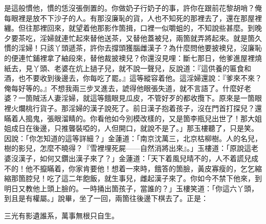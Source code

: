 是這般慣他，慣的恁沒張倒置的。你做奶子行奶子的事，許你在跟前花黎胡哨？俺每眼裡是放不下沙子的人。有那沒廉恥的貨，人也不知死的那裡去了，還在那屋裡纏。但往那裡回來，就望着他那影作箇揖，口裡一似嚼蛆的，不知說些甚麼。到晚夕要茶吃，淫婦就連忙起來替他送茶，又替他蓋被兒，兩箇就弄將起來。就是箇久慣的淫婦！只該丫頭遞茶，許你去撐頭獲腦雌漢子？為什麼問他要披襖兒，沒廉恥的便連忙鋪裡拿了紬段來，替他裁披襖兒？你還沒見哩：斷七那日，他爹進屋裡燒紙去，見丫頭、老婆在炕上撾子兒，就不說一聲兒，反說道：『這供養的匾食和酒，也不要收到後邊去，你每吃了罷。』這等縱容着他。這淫婦還說：『爹來不來？俺每好等的。』不想我兩三步叉進去，諕得他眼張失道，就不言語了。什麼好老婆？一箇賊活人妻淫婦，就這等餓眼見瓜皮，不管好歹的都收攬下。原來是一箇眼裡火爛桃行貨子。那淫婦的漢子說死了。前日漢子抱着孩子，沒在門首打探兒？還瞞着人搗鬼，張眼溜睛的。你看他如今別模改樣的，又是箇李瓶兒出世了！{}那大姐姐成日在後邊，只推聾裝啞的，人但開口，就說不是了。」那玉樓聽了，只是笑。因說：「你怎知道的這等詳細？」金蓮道：「南京沈萬三，北京枯柳樹。人的名兒，樹的影兒，怎麼不曉得？『雪裡埋死屍——自然消將出來』。」玉樓道：「原說這老婆沒漢子，如何又鑽出漢子來了？」金蓮道：「天下着風兒晴不的，人不着謊兒成不的！他不攛瞞着，你家肯要他！想着一來時，餓答的箇臉，黃皮寡瘦的，乞乞縮縮那箇腔兒！{}吃了這二年飽飯，就生事兒，雌起漢子來了。你如今不禁下他來，到明日又教他上頭上臉的。一時捅出箇孩子，當誰的？」{}玉樓笑道：「你這六丫頭，到且是有權屬。」說畢，坐了一回，兩箇往後邊下棋去了。正是：

\begin{myquote}
三光有影遺誰系，萬事無根只自生。
\end{myquote}


